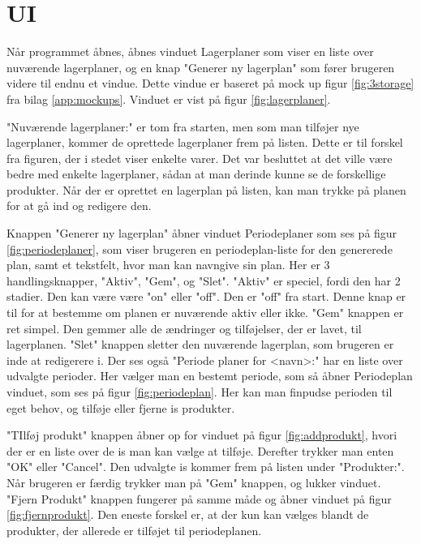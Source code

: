 \section{UI} 
Når programmet åbnes, åbnes vinduet Lagerplaner som viser en liste over nuværende lagerplaner, og en knap "Generer ny lagerplan" som fører brugeren videre til endnu et vindue. Dette vindue er baseret på mock up figur \ref{fig:3storage} fra bilag \ref{app:mockups}. Vinduet er vist på figur \ref{fig:lagerplaner}. 

"Nuværende lagerplaner:" er tom fra starten, men som man tilføjer nye lagerplaner, kommer de oprettede lagerplaner frem på listen. Dette er til forskel fra figuren, der i stedet viser enkelte varer. Det var besluttet at det ville være bedre med enkelte lagerplaner, sådan at man derinde kunne se de forskellige produkter. 
Når der er oprettet en lagerplan på listen, kan man trykke på planen for at gå ind og redigere den. 

Knappen "Generer ny lagerplan" åbner vinduet Periodeplaner som ses på figur \ref{fig:periodeplaner}, som viser brugeren en periodeplan-liste for den genererede plan, samt et tekstfelt, hvor man kan navngive sin plan. Her er 3 handlingsknapper, "Aktiv", "Gem", og "Slet". 
"Aktiv" er speciel, fordi den har 2 stadier. Den kan være være "on" eller "off". Den er "off" fra start. Denne knap er til for at bestemme om planen er nuværende aktiv eller ikke. "Gem" knappen er ret simpel. Den gemmer alle de ændringer og tilføjelser, der er lavet, til lagerplanen. "Slet" knappen sletter den nuværende lagerplan, som brugeren er inde at redigerere i. 
Der ses også "Periode planer for <navn>:" har en liste over udvalgte perioder. Her vælger man en bestemt periode, som så åbner Periodeplan vinduet, som ses på figur \ref{fig:periodeplan}. Her kan man finpudse perioden til eget behov, og tilføje eller fjerne is produkter.   

"TIlføj produkt" knappen åbner op for vinduet på figur \ref{fig:addprodukt}, hvori der er en liste over de is man kan vælge at tilføje. Derefter trykker man enten "OK" eller "Cancel". Den udvalgte is kommer frem på listen under "Produkter:". Når brugeren er færdig trykker man på "Gem" knappen, og lukker vinduet. 
"Fjern Produkt" knappen fungerer på samme måde og åbner vinduet på figur \ref{fig:fjernprodukt}. Den eneste forskel er, at der kun kan vælges blandt de produkter, der allerede er tilføjet til periodeplanen.

